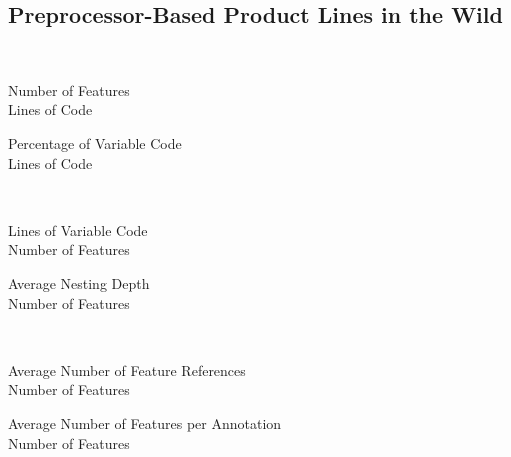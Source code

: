 \subsection{Preprocessor-Based Product Lines in the Wild}
\begin{frame}{\myframetitle\ \mytitlesource{\fortyproductlines}}
	\begin{mycolumns}
		\begin{exampletight}{Number of Features}
			\centering{}\\Lines of Code
		\end{exampletight}
	\mynextcolumn
		\begin{exampletight}{Percentage of Variable Code}
			\centering{}\\Lines of Code
		\end{exampletight}
	\end{mycolumns}
\end{frame}

\begin{frame}{\myframetitle\ \mytitlesource{\fortyproductlines}}
	\begin{mycolumns}
		\begin{exampletight}{Lines of Variable Code}
			\centering{}\\Number of Features
		\end{exampletight}
	\mynextcolumn
		\begin{exampletight}{Average Nesting Depth}
			\centering{}\\Number of Features
		\end{exampletight}
	\end{mycolumns}
\end{frame}

\begin{frame}{\myframetitle\ \mytitlesource{\fortyproductlines}}
	\begin{mycolumns}
		\begin{exampletight}{Average Number of Feature References}
			\centering{}\\Number of Features
		\end{exampletight}
	\mynextcolumn
		\begin{exampletight}{Average Number of Features per Annotation}
			\centering{}\\Number of Features
		\end{exampletight}
	\end{mycolumns}
\end{frame}

